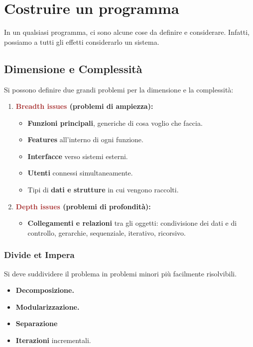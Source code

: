 \chapter{Costruire un programma}
In un qualsiasi programma, ci sono alcune cose da definire e considerare. Infatti, possiamo a tutti gli effetti considerarlo un sistema.

\section{Dimensione e Complessità}
Si possono definire due grandi problemi per la dimensione e la complessità:
\begin{enumerate}
    \item \textbf{\textcolor{brown}{Breadth issues} (problemi di ampiezza):}
    \begin{itemize}
        \item \textbf{Funzioni principali}, generiche di cosa voglio che faccia.
        \item \textbf{Features} all'interno di ogni funzione.
        \item \textbf{Interfacce} verso sistemi esterni.
        \item \textbf{Utenti} connessi simultaneamente.
        \item Tipi di \textbf{dati e strutture} in cui vengono raccolti.
    \end{itemize}
    \item \textbf{\textcolor{brown}{Depth issues} (problemi di profondità):}
    \begin{itemize}
        \item \textbf{Collegamenti e relazioni} tra gli oggetti: condivisione dei dati e di controllo, gerarchie, sequenziale, iterativo, ricorsivo.
    \end{itemize}
\end{enumerate}

\subsection{Divide et Impera} 
Si deve suddividere il problema in problemi minori più facilmente risolvibili.
    \begin{itemize}
        \item \textbf{Decomposizione.}
        \item \textbf{Modularizzazione.}
        \item \textbf{Separazione}
        \item \textbf{Iterazioni} incrementali.
    \end{itemize}

